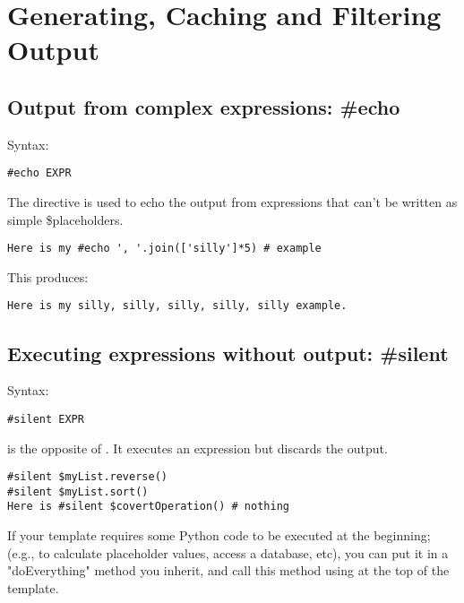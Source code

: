 \section{Generating, Caching and Filtering Output}
\label{output}

\subsection{Output from complex expressions: \#echo}
\label{output.echo}

Syntax:
\begin{verbatim}
#echo EXPR
\end{verbatim}

The  directive is used to echo the output from expressions that
can't be written as simple \$placeholders.  

\begin{verbatim}
Here is my #echo ', '.join(['silly']*5) # example 
\end{verbatim}

This produces:

\begin{verbatim}
Here is my silly, silly, silly, silly, silly example.
\end{verbatim}


\subsection{Executing expressions without output: \#silent}
\label{output.silent}

Syntax:
\begin{verbatim}
#silent EXPR
\end{verbatim}

 is the opposite of .  It executes an expression
but discards the output.

\begin{verbatim}
#silent $myList.reverse()
#silent $myList.sort()
Here is #silent $covertOperation() # nothing
\end{verbatim}

If your template requires some Python code to be executed at the beginning;
(e.g., to calculate placeholder values, access a database, etc), you can put
it in a "doEverything" method you inherit, and call this method using
 at the top of the template.

